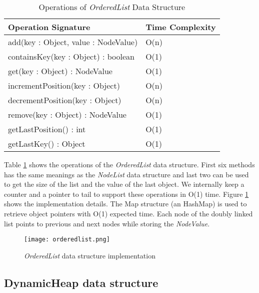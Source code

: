 \begin{table}
\centering
\caption{Operations of \textit{OrderedList} Data Structure}
\begin{tabular}{|l|l|} \hline
Operation Signature & Time Complexity \\ \hline \hline
add(key : Object, value : NodeValue) & O(n) \\ \hline
containsKey(key : Object) : boolean & O(1) \\ \hline
get(key : Object) : NodeValue & O(1) \\ \hline
incrementPosition(key : Object) & O(n) \\ \hline
decrementPosition(key : Object) & O(n) \\ \hline
remove(key : Object) : NodeValue & O(1) \\ \hline
getLastPosition() : int & O(1) \\ \hline
getLastKey() : Object & O(1) \\ \hline
\end{tabular}
\label{orderedlist_api}
\end{table}

Table \ref{orderedlist_api} shows the operations of the \textit{OrderedList} data structure. First six methods has the same meanings as the \textit{NodeList} data structure and last two can be used to get the size of the list and the value of the last object. We internally keep a counter and a pointer to tail to support these operations in O(1) time. Figure \ref{orderedlist_impl} shows the implementation details. The Map structure (an HashMap) is used to retrieve object pointers with O(1) expected time. Each node of the doubly linked list points to previous and next nodes while storing the \textit{NodeValue}.


\begin{figure}[!t]
        \centering
        \texttt{[image: orderedlist.png]}
        \caption{\textit{OrderedList} data structure implementation}
        \label{orderedlist_impl}
\end{figure}

\subsection{DynamicHeap data structure}

